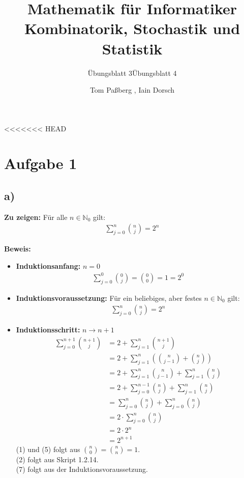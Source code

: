 \documentclass[a4paper]{scrartcl}
\title{Mathematik für Informatiker \\ Kombinatorik, Stochastik und Statistik}
\subtitle{Übungsblatt 3}
\subtitle{Übungsblatt 4}
\author{Tom Paßberg , Iain Dorsch}
\date{}
\begin{document}
\maketitle

\newpage
<<<<<<< HEAD
\section*{Aufgabe 1}
\subsection*{a)}
\textbf{Zu zeigen:} Für alle $ n \in \mathbb{N}_0$ gilt: 
\begin{align*}
    \sum_{j=0}^{n} \binom{n}{j} = 2^n
\end{align*}

\textbf{Beweis:} 
\begin{itemize}
    \item \textbf{Induktionsanfang:} $n = 0$
    \begin{align*}
        \sum_{j=0}^{0} \binom{0}{j} = \binom{0}{0} = 1 = 2^0
    \end{align*}
    \item \textbf{Induktionsvoraussetzung:} Für ein beliebiges, aber festes $n \in \mathbb{N}_0$ gilt:
    \begin{align*}
        \sum_{j=0}^{n} \binom{n}{j} = 2^n
    \end{align*}
    \item \textbf{Induktionsschritt:} $n \to n+1$
    \begin{align}
        \sum_{j=0}^{n+1} \binom{n+1}{j} &= 2 + \sum_{j=1}^{n} \binom{n+1}{j} \\ 
        &= 2 + \sum_{j=1}^{n} \left( \binom{n}{j-1} + \binom{n}{j} \right) \\
        &= 2 + \sum_{j=1}^{n} \binom{n}{j-1} + \sum_{j=1}^{n}\binom{n}{j} \\
        &= 2 + \sum_{j=0}^{n-1} \binom{n}{j} + \sum_{j=1}^{n} \binom{n}{j} \\
        &= \sum_{j=0}^{n} \binom{n}{j} + \sum_{j=0}^{n} \binom{n}{j} \\
        &= 2 \cdot \sum_{j=0}^{n} \binom{n}{j} \\
        &= 2 \cdot 2^n \\[8px]
        &= 2^{n+1}
    \end{align}
    (1) und (5) folgt aus $ \binom{n}{0} = \binom{n}{n} = 1$. \\
    (2) folgt aus Skript 1.2.14. \\
    (7) folgt aus der Induktionsvoraussetzung. 
\end{itemize}
\end{document}

